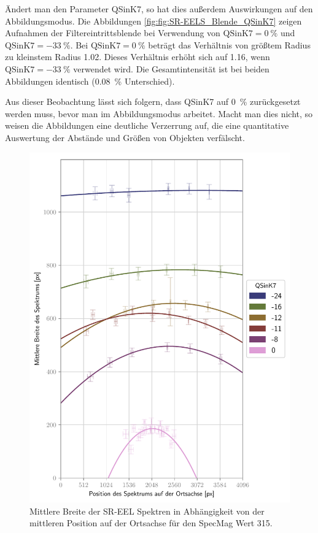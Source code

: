 \documentclass[
	paper=a4,				%
	twoside=true,			%
	BCOR=6mm,				%
	fontsize=12pt,			%
	pagesize=auto,			%
	numbers=noenddot,		%
	bibliography=totoc,		%
	draft=false
]{scrartcl}
\begin{document}
Ändert man den Parameter QSinK7, so hat dies außerdem Auswirkungen auf den Abbildungsmodus. Die Abbildungen \ref{fig:fig:SR-EELS_Blende_QSinK7} zeigen Aufnahmen der Filtereintrittsblende bei Verwendung von $\mathrm{QSinK7}=\SI{0}{\percent}$ und $\mathrm{QSinK7}=\SI{-33}{\percent}$. Bei $\mathrm{QSinK7}=\SI{0}{\percent}$ beträgt das Verhältnis von größtem Radius zu kleinstem Radius \num{1,02}. Dieses Verhältnis erhöht sich auf \num{1,16}, wenn $\mathrm{QSinK7}=\SI{-33}{\percent}$ verwendet wird. Die Gesamtintensität ist bei beiden Abbildungen identisch (\SI{0,08}{\percent} Unterschied).

Aus dieser Beobachtung lässt sich folgern, dass QSinK7 auf \SI{0}{\percent} zurückgesetzt werden muss, bevor man im Abbildungsmodus arbeitet. Macht man dies nicht, so weisen die Abbildungen eine deutliche Verzerrung auf, die eine quantitative Auswertung der Abstände und Größen von Objekten verfälscht.

\clearpage

\begin{figure}
	\centering
	\includegraphics[width=.9\linewidth]{../../Jupyter-Notebooks/Kapitel2/Bilder/QSinK7_SM315_width-vs-pos}
	\caption{Mittlere Breite der SR-EEL Spektren in Abhängigkeit von der mittleren Position auf der Ortsachse für den SpecMag Wert 315.}
	\label{fig:SR-EELS_Charakterisierung_QSinK7_SM315_Pos}
\end{figure}
\end{document}
